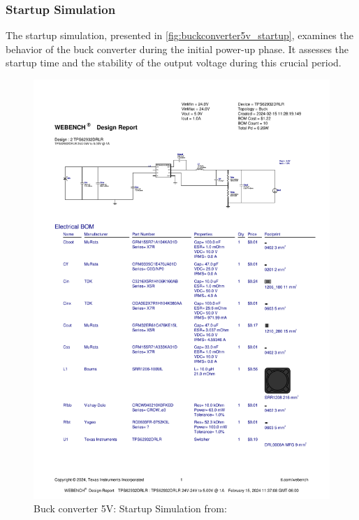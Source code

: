 \subsubsection{Startup Simulation}
The startup simulation, presented in \autoref{fig:buckconverter5v_startup}, examines the behavior of the buck converter during the initial power-up phase. It assesses the startup time and the stability of the output voltage during this crucial period.
\begin{figure}[H]
    \centering
    \includegraphics[trim=0 235 0 70,clip,width=0.8\linewidth,page=8]{img//buckconverters//5v/WBDesign2_Startup.pdf}
    \caption{Buck converter 5V: Startup Simulation from: %
    }
    \label{fig:buckconverter5v_startup}
\end{figure}

